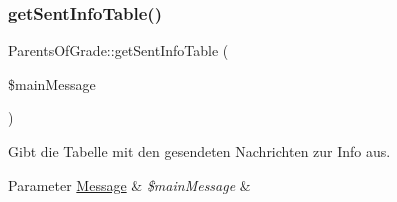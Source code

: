\subsubsection{\texorpdfstring{get\+Sent\+Info\+Table()}{getSentInfoTable()}}
{\footnotesize\ttfamily Parents\+Of\+Grade\+::get\+Sent\+Info\+Table (\begin{DoxyParamCaption}\item[{}]{\$main\+Message }\end{DoxyParamCaption})}

Gibt die Tabelle mit den gesendeten Nachrichten zur Info aus. 
\begin{DoxyParams}[1]{Parameter}
\mbox{\hyperlink{class_message}{Message}} & {\em \$main\+Message} & \\
\hline
\end{DoxyParams}
~\newline
